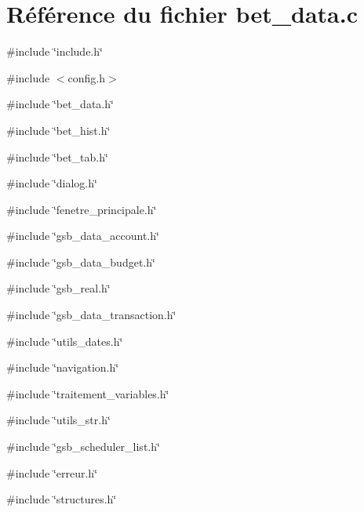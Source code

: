 \section{Référence du fichier bet\_\-data.c}
\label{bet__data_8c}
{\ttfamily \#include \char`\"{}include.h\char`\"{}}\par
{\ttfamily \#include $<$config.h$>$}\par
{\ttfamily \#include \char`\"{}bet\_\-data.h\char`\"{}}\par
{\ttfamily \#include \char`\"{}bet\_\-hist.h\char`\"{}}\par
{\ttfamily \#include \char`\"{}bet\_\-tab.h\char`\"{}}\par
{\ttfamily \#include \char`\"{}dialog.h\char`\"{}}\par
{\ttfamily \#include \char`\"{}fenetre\_\-principale.h\char`\"{}}\par
{\ttfamily \#include \char`\"{}gsb\_\-data\_\-account.h\char`\"{}}\par
{\ttfamily \#include \char`\"{}gsb\_\-data\_\-budget.h\char`\"{}}\par
{\ttfamily \#include \char`\"{}gsb\_\-real.h\char`\"{}}\par
{\ttfamily \#include \char`\"{}gsb\_\-data\_\-transaction.h\char`\"{}}\par
{\ttfamily \#include \char`\"{}utils\_\-dates.h\char`\"{}}\par
{\ttfamily \#include \char`\"{}navigation.h\char`\"{}}\par
{\ttfamily \#include \char`\"{}traitement\_\-variables.h\char`\"{}}\par
{\ttfamily \#include \char`\"{}utils\_\-str.h\char`\"{}}\par
{\ttfamily \#include \char`\"{}gsb\_\-scheduler\_\-list.h\char`\"{}}\par
{\ttfamily \#include \char`\"{}erreur.h\char`\"{}}\par
{\ttfamily \#include \char`\"{}structures.h\char`\"{}}\par
